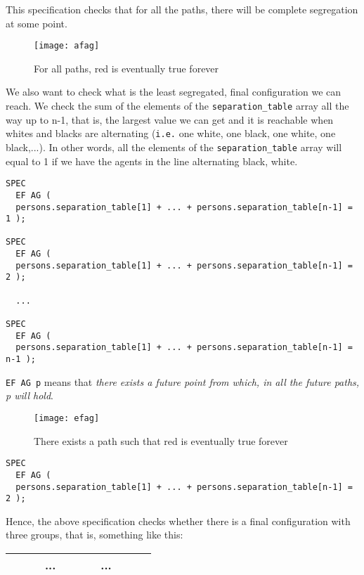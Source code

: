 \documentclass[../main.tex]{subfiles}
\begin{document}
This specification checks that for all the paths, there will be complete segregation at some point. 

\begin{figure}[H]
\centering
\texttt{[image: afag]}
\caption{For all paths, red is eventually true forever \cite[]{ctl_picture}}
\end{figure}


We also want to check what is the least segregated, final configuration  we can reach. We check the sum of the elements of the \verb|separation_table| array all the way up to n-1, that is, the largest value we can get and it is reachable when whites and blacks are alternating (\verb|i.e.| one white, one black, one white, one black,...). In other words, all the elements of the \verb|separation_table| array will equal to 1 if we have the agents in the line alternating black, white.
 \begin{lstlisting}
SPEC
  EF AG (
  persons.separation_table[1] + ... + persons.separation_table[n-1] = 1 );

SPEC  
  EF AG (
  persons.separation_table[1] + ... + persons.separation_table[n-1] = 2 );
  
  ...

SPEC  
  EF AG (
  persons.separation_table[1] + ... + persons.separation_table[n-1] = n-1 );
 \end{lstlisting}

\verb|EF AG p| means that \textit{there exists a future point from which, in all the future paths, p will hold}. 
\begin{figure}[H]
\centering
\texttt{[image: efag]}
\caption{There exists a path such that red is eventually true forever \cite[]{ctl_picture}}
\end{figure}

\begin{lstlisting}
SPEC  
  EF AG (
  persons.separation_table[1] + ... + persons.separation_table[n-1] = 2 );
 \end{lstlisting}
Hence, the above specification checks whether there is a final configuration with three groups, that is, something like this:
  
 \begin{table}[H]
\begin{center}
{\begin{tabular}{| c |c| c| c| c |c| c |c|c|c|c|}
\hline
\z &\z & \z & ...  &\x &\x &\x & ... &\z&\z&\z \\
 \hline
\end{tabular}}
\end{center}
\end{table} 
\end{document}
